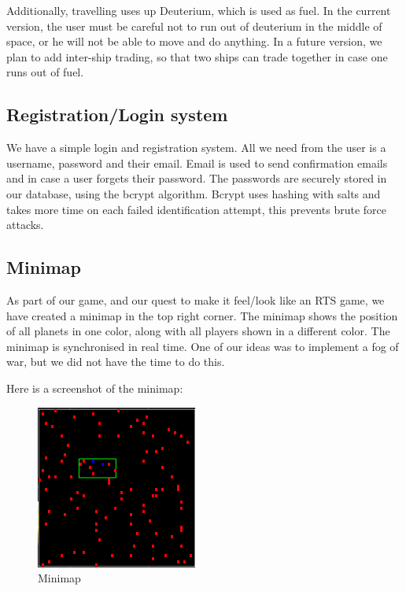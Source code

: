 \documentclass[a4paper,11pt]{article}
\begin{document}
			Additionally, travelling uses up Deuterium, which is used as fuel. In the current version, the user must be careful not to run out of deuterium in the middle of space, or he will not be able to move and do anything. In a future version, we plan to add inter-ship trading, so that two ships can trade together in case one runs out of fuel.
			
		
		\subsection{Registration/Login system}
			We have a simple login and registration system. All we need from the user is a username, password and their email. Email is used to send confirmation emails and in case a user forgets their password. The passwords are securely stored in our database, using the bcrypt algorithm. Bcrypt uses hashing with salts and takes more time on each failed identification attempt, this prevents brute force attacks. 
		
		\subsection{Minimap}
			
			As part of our game, and our quest to make it feel/look like an RTS game, we have created a minimap in the top right corner. The minimap shows the position of all planets in one color, along with all players shown in a different color. The minimap is synchronised in real time. One of our ideas was to implement a fog of war, but we did not have the time to do this.
			
			Here is a screenshot of the minimap:
			
			\begin{figure}[htb]
			\begin{center}
			\leavevmode
			\includegraphics[scale=0.7]{minimap.png}
			\end{center}
			\caption{Minimap}
			\label{fig:minimap}
			\end{figure}
			
\end{document}
